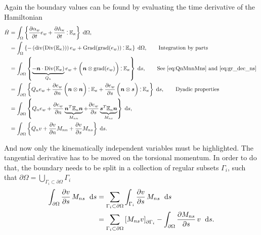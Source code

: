 \documentclass[preprint,12pt]{elsarticle}
\newcommand{\tens}[1]{%
	\mathbin{\mathop{\otimes}\displaylimits_{#1}}%
}
\def\onedot{$\mathsurround0pt\ldotp$}
\def\cddot{%
	\mathbin{\vcenter{\baselineskip.67ex
			\hbox{\onedot}\hbox{\onedot}}%
}}
\begin{document}
	Again the boundary values can be found by evaluating the time derivative of the Hamiltonian
	\begin{equation}
	\begin{aligned}
	\dot{H}&= \int_{\Omega} \left\{ \diffp{\alpha_w}{t} e_w  + \diffp{\mathbb{A}_{\kappa}}{t} \cddot \mathbb{E}_{\kappa} \right\} \d\Omega, \\
	&= \int_{\Omega} \left\{ - \left(\mathrm{div}(\mathrm{Div}(\mathbb{E}_{\kappa}))  \right) e_w + \mathrm{Grad}(\mathrm{grad}(e_w)) \cddot \mathbb{E}_{\kappa} \right\} \d\Omega, \qquad \text{Integration by parts} \\
	&=  \int_{\partial \Omega} \left\{ \underbrace{  - \bm{n} \cdot \mathrm{Div}(\mathbb{E}_{\kappa}) }_{Q_n} e_w + \left(\bm{n} \tens{} \mathrm{grad}(e_w) \right)\cddot \mathbb{E}_{\kappa} \right\} \d{s}, \qquad \text{See \eqref{eq:QnMnnMns} and \eqref{eq:gr_dec_ns} }  \\
	&= \int_{\partial \Omega} \left\{ Q_n e_w + \diffp{e_w}{n} \left(\bm{n} \tens{}\bm{n} \right) \cddot \mathbb{E}_{\kappa} + \diffp{e_w}{s}\left(\bm{n} \tens{}\bm{s} \right)\cddot \mathbb{E}_{\kappa} \right\} \d{s}, \qquad \text{Dyadic properties} \\
	&=\int_{\partial \Omega} \left\{ Q_n e_w + \diffp{e_w}{n} \underbrace{\bm{n}^T  \mathbb{E}_{\kappa} \bm{n}}_{M_{nn}} + \diffp{e_w}{s}  \underbrace{\bm{s}^T  \mathbb{E}_{\kappa} \bm{n}}_{M_{ns}}   \right\} \d{s}, \\
	&=\int_{\partial \Omega} \left\{ Q_n v + \diffp{v}{n} M_{nn} + \diffp{v}{s}  M_{ns}   \right\} \d{s}. 
	\end{aligned}
	\end{equation}
	
	And now only the kinematically independent variables must be highlighted. The tangential derivative has to be moved on the torsional momentum. In order to do that, the boundary needs to be split in a collection of regular subsets $\Gamma_{i}$, such that $\partial \Omega = \bigcup_{\Gamma_{i} \subset \partial \Omega} \Gamma_{i}$
	\begin{equation}
	\begin{aligned}
	\int_{\partial \Omega} \diffp{v}{s} \, M_{ns} \ \d{s} &= \sum_{\Gamma_{i} \subset \partial \Omega} \int_{\Gamma_{i}}  \diffp{v}{s} \, M_{ns} \ \d{s} \\
	&= \sum_{\Gamma_{i} \subset \partial \Omega} \left[ M_{ns} v\right]_{\partial \Gamma_i} - \int_{\partial \Omega} \diffp{M_{ns}}{s} \, v \ \d{s}.
	\end{aligned}
	\end{equation}
	
\end{document}

